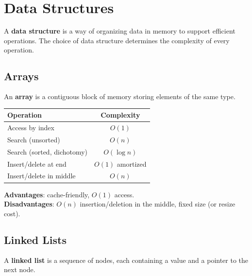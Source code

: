 \documentclass[11pt,a4paper]{article}
\begin{document}
\section{Data Structures}

A \textbf{data structure} is a way of organizing data in memory to support efficient operations. The choice of data structure determines the complexity of every operation.

\subsection{Arrays}

An \textbf{array} is a contiguous block of memory storing elements of the same type.

\begin{center}
\end{center}

\begin{center}
\begin{tabular}{lc}
\toprule
Operation & Complexity \\
\midrule
Access by index & $O(1)$ \\
Search (unsorted) & $O(n)$ \\
Search (sorted, dichotomy) & $O(\log n)$ \\
Insert/delete at end & $O(1)$ amortized \\
Insert/delete in middle & $O(n)$ \\
\bottomrule
\end{tabular}
\end{center}

\textbf{Advantages}: cache-friendly, $O(1)$ access.\\
\textbf{Disadvantages}: $O(n)$ insertion/deletion in the middle, fixed size (or resize cost).

\subsection{Linked Lists}

A \textbf{linked list} is a sequence of nodes, each containing a value and a pointer to the next node.
\end{document}
